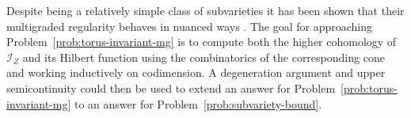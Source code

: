 \documentclass[11pt,reqno]{amsart}
\newtheorem{problem}[lemma]{Research Problem}
\theoremstyle{remark}
\newcommand{\PP}{\mathbb{P}}
\newcommand{\cI}{\mathcal{I}}
\begin{document}
Despite being a relatively simple class of subvarieties it has been shown that their multigraded regularity behaves in nuanced ways \cite{bruceHellerSayrafi22}.  The goal for approaching Problem~\ref{prob:torus-invariant-mg} is to compute both the higher cohomology of $\cI_Z$ and its Hilbert function using the combinatorics of the corresponding cone and working inductively on codimension. A degeneration argument and upper semicontinuity could then be used to extend an answer for Problem~\ref{prob:torus-invariant-mg} to an answer for Problem~\ref{prob:subvariety-bound}.

%
%
\end{document}
